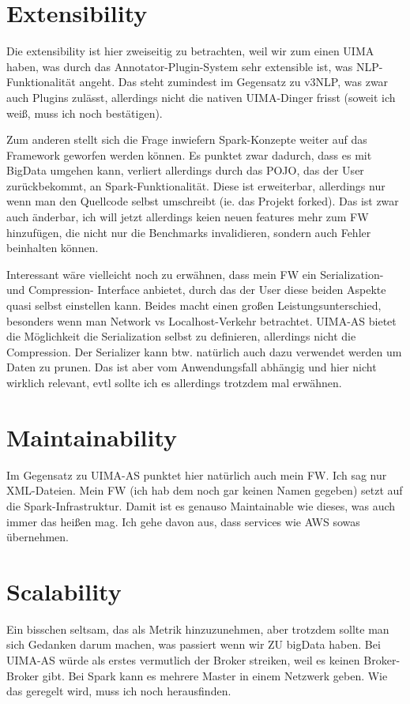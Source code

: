 \section{Extensibility}

Die extensibility ist hier zweiseitig zu betrachten, weil wir zum einen UIMA haben, was durch das Annotator-Plugin-System sehr extensible ist, was NLP-Funktionalität angeht. Das steht zumindest im Gegensatz zu v3NLP, was zwar auch Plugins zulässt, allerdings nicht die nativen UIMA-Dinger frisst (soweit ich weiß, muss ich noch bestätigen).

Zum anderen stellt sich die Frage inwiefern Spark-Konzepte weiter auf das Framework geworfen werden können. Es punktet zwar dadurch, dass es mit BigData umgehen kann, verliert allerdings durch das POJO, das der User zurückbekommt, an Spark-Funktionalität. Diese ist erweiterbar, allerdings nur wenn man den Quellcode selbst umschreibt (ie. das Projekt forked). Das ist zwar auch änderbar, ich will jetzt allerdings keien neuen features mehr zum FW hinzufügen, die nicht nur die Benchmarks invalidieren, sondern auch Fehler beinhalten können.

Interessant wäre vielleicht noch zu erwähnen, dass mein FW ein Serialization- und Compression- Interface anbietet, durch das der User diese beiden Aspekte quasi selbst einstellen kann. Beides macht einen großen Leistungsunterschied, besonders wenn man Network vs Localhost-Verkehr betrachtet. UIMA-AS bietet die Möglichkeit die Serialization selbst zu definieren, allerdings nicht die Compression. Der Serializer kann btw. natürlich auch dazu verwendet werden um Daten zu prunen. Das ist aber vom Anwendungsfall abhängig und hier nicht wirklich relevant, evtl sollte ich es allerdings trotzdem mal erwähnen.

\section{Maintainability}

Im Gegensatz zu UIMA-AS punktet hier natürlich auch mein FW. Ich sag nur XML-Dateien.
Mein FW (ich hab dem noch gar keinen Namen gegeben) setzt auf die Spark-Infrastruktur. Damit ist es genauso Maintainable wie dieses, was auch immer das heißen mag. Ich gehe davon aus, dass services wie AWS sowas übernehmen.

\section{Scalability}

Ein bisschen seltsam, das als Metrik hinzuzunehmen, aber trotzdem sollte man sich Gedanken darum machen, was passiert wenn wir ZU bigData haben. Bei UIMA-AS würde als erstes vermutlich der Broker streiken, weil es keinen Broker-Broker gibt. Bei Spark kann es mehrere Master in einem Netzwerk geben. Wie das geregelt wird, muss ich noch herausfinden.